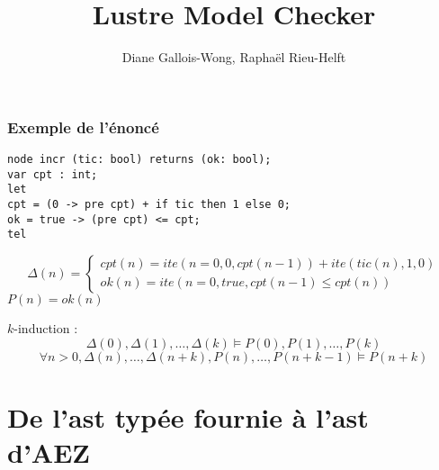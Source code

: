 \documentclass[18pt]{beamer}
\title{Lustre Model Checker}
\author{Diane Gallois-Wong, Raphaël Rieu-Helft}
\begin{document}
\begin{frame}
	\titlepage
\end{frame}
\begin{frame}[fragile]
\frametitle{Exemple de l'énoncé}
\begin{lstlisting}
node incr (tic: bool) returns (ok: bool);
var cpt : int;
let
cpt = (0 -> pre cpt) + if tic then 1 else 0;
ok = true -> (pre cpt) <= cpt;
tel
\end{lstlisting}

$$\Delta(n) =
\begin{cases}
cpt(n) = ite(n=0, 0, cpt(n-1)) + ite(tic(n), 1, 0)
\\
ok(n) = ite(n = 0, true, cpt(n - 1) \leq cpt(n))
\end{cases}
$$
\qquad$P(n) = ok(n)$

\vspace{2em}

	$k$-induction :
	$$\Delta(0), \Delta(1), \ldots, \Delta(k) \models  P(0), P(1), \ldots,  P(k)$$
	$$\forall n>0, {\Delta(n), \ldots, \Delta(n+k), P(n), \ldots, P(n+k-1) \models P(n+k)}$$

\end{frame}

\begin{frame}
\tableofcontents
\end{frame}

\section{De l'ast typée fournie à l'ast d'AEZ}
\end{document}
